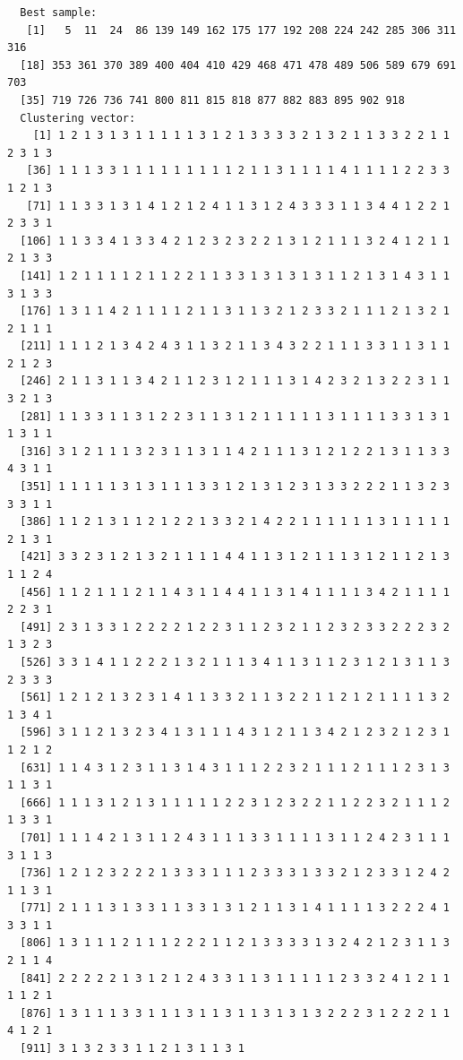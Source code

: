 \documentclass[12pt,twoside]{amherstthesis}
\begin{document}
\begin{verbatim}
  Best sample:
   [1]   5  11  24  86 139 149 162 175 177 192 208 224 242 285 306 311 316
  [18] 353 361 370 389 400 404 410 429 468 471 478 489 506 589 679 691 703
  [35] 719 726 736 741 800 811 815 818 877 882 883 895 902 918
  Clustering vector:
    [1] 1 2 1 3 1 3 1 1 1 1 1 3 1 2 1 3 3 3 3 2 1 3 2 1 1 3 3 2 2 1 1 2 3 1 3
   [36] 1 1 1 3 3 1 1 1 1 1 1 1 1 1 2 1 1 3 1 1 1 1 4 1 1 1 1 2 2 3 3 1 2 1 3
   [71] 1 1 3 3 1 3 1 4 1 2 1 2 4 1 1 3 1 2 4 3 3 3 1 1 3 4 4 1 2 2 1 2 3 3 1
  [106] 1 1 3 3 4 1 3 3 4 2 1 2 3 2 3 2 2 1 3 1 2 1 1 1 3 2 4 1 2 1 1 2 1 3 3
  [141] 1 2 1 1 1 1 2 1 1 2 2 1 1 3 3 1 3 1 3 1 3 1 1 2 1 3 1 4 3 1 1 3 1 3 3
  [176] 1 3 1 1 4 2 1 1 1 1 2 1 1 3 1 1 3 2 1 2 3 3 2 1 1 1 2 1 3 2 1 2 1 1 1
  [211] 1 1 1 2 1 3 4 2 4 3 1 1 3 2 1 1 3 4 3 2 2 1 1 1 3 3 1 1 3 1 1 2 1 2 3
  [246] 2 1 1 3 1 1 3 4 2 1 1 2 3 1 2 1 1 1 3 1 4 2 3 2 1 3 2 2 3 1 1 3 2 1 3
  [281] 1 1 3 3 1 1 3 1 2 2 3 1 1 3 1 2 1 1 1 1 1 3 1 1 1 1 3 3 1 3 1 1 3 1 1
  [316] 3 1 2 1 1 1 3 2 3 1 1 3 1 1 4 2 1 1 1 3 1 2 1 2 2 1 3 1 1 3 3 4 3 1 1
  [351] 1 1 1 1 1 3 1 3 1 1 1 3 3 1 2 1 3 1 2 3 1 3 3 2 2 2 1 1 3 2 3 3 3 1 1
  [386] 1 1 2 1 3 1 1 2 1 2 2 1 3 3 2 1 4 2 2 1 1 1 1 1 1 3 1 1 1 1 1 2 1 3 1
  [421] 3 3 2 3 1 2 1 3 2 1 1 1 1 4 4 1 1 3 1 2 1 1 1 3 1 2 1 1 2 1 3 1 1 2 4
  [456] 1 1 2 1 1 1 2 1 1 4 3 1 1 4 4 1 1 3 1 4 1 1 1 1 3 4 2 1 1 1 1 2 2 3 1
  [491] 2 3 1 3 3 1 2 2 2 2 1 2 2 3 1 1 2 3 2 1 1 2 3 2 3 3 2 2 2 3 2 1 3 2 3
  [526] 3 3 1 4 1 1 2 2 2 1 3 2 1 1 1 3 4 1 1 3 1 1 2 3 1 2 1 3 1 1 3 2 3 3 3
  [561] 1 2 1 2 1 3 2 3 1 4 1 1 3 3 2 1 1 3 2 2 1 1 2 1 2 1 1 1 1 3 2 1 3 4 1
  [596] 3 1 1 2 1 3 2 3 4 1 3 1 1 1 4 3 1 2 1 1 3 4 2 1 2 3 2 1 2 3 1 1 2 1 2
  [631] 1 1 4 3 1 2 3 1 1 3 1 4 3 1 1 1 2 2 3 2 1 1 1 2 1 1 1 2 3 1 3 1 1 3 1
  [666] 1 1 1 3 1 2 1 3 1 1 1 1 1 2 2 3 1 2 3 2 2 1 1 2 2 3 2 1 1 1 2 1 3 3 1
  [701] 1 1 1 4 2 1 3 1 1 2 4 3 1 1 1 3 3 1 1 1 1 3 1 1 2 4 2 3 1 1 1 3 1 1 3
  [736] 1 2 1 2 3 2 2 2 1 3 3 3 1 1 1 2 3 3 3 1 3 3 2 1 2 3 3 1 2 4 2 1 1 3 1
  [771] 2 1 1 1 3 1 3 3 1 1 3 3 1 3 1 2 1 1 3 1 4 1 1 1 1 3 2 2 2 4 1 3 3 1 1
  [806] 1 3 1 1 1 2 1 1 1 2 2 2 1 1 2 1 3 3 3 3 1 3 2 4 2 1 2 3 1 1 3 2 1 1 4
  [841] 2 2 2 2 2 1 3 1 2 1 2 4 3 3 1 1 3 1 1 1 1 1 2 3 3 2 4 1 2 1 1 1 1 2 1
  [876] 1 3 1 1 1 3 3 1 1 1 3 1 1 3 1 1 3 1 3 1 3 2 2 2 3 1 2 2 2 1 1 4 1 2 1
  [911] 3 1 3 2 3 3 1 1 2 1 3 1 1 3 1
  

\end{verbatim}
\end{document}

